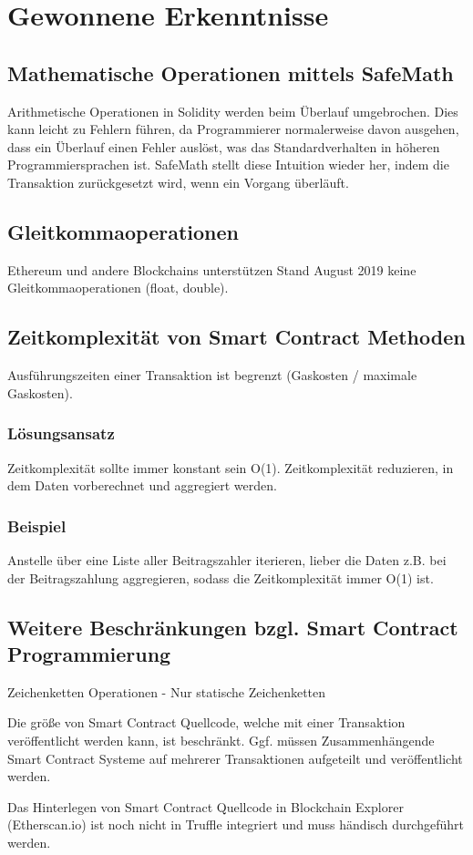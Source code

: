 \section{Gewonnene Erkenntnisse}


\subsection{Mathematische Operationen mittels SafeMath}
Arithmetische Operationen in Solidity werden beim Überlauf umgebrochen. Dies kann leicht zu Fehlern führen, da Programmierer normalerweise davon ausgehen, dass ein Überlauf einen Fehler auslöst, was das Standardverhalten in höheren Programmiersprachen ist. SafeMath stellt diese Intuition wieder her, indem die Transaktion zurückgesetzt wird, wenn ein Vorgang überläuft. %


\subsection{Gleitkommaoperationen}
Ethereum und andere Blockchains unterstützen Stand August 2019 keine Gleitkommaoperationen (float, double).


\subsection{Zeitkomplexität von Smart Contract Methoden}
Ausführungszeiten einer Transaktion ist begrenzt (Gaskosten / maximale Gaskosten).

\subsubsection*{Lösungsansatz}
Zeitkomplexität sollte immer konstant sein O(1). Zeitkomplexität reduzieren, in dem Daten vorberechnet und aggregiert werden.

\subsubsection*{Beispiel} Anstelle über eine Liste aller Beitragszahler iterieren, lieber die Daten z.B. bei der Beitragszahlung aggregieren, sodass die Zeitkomplexität immer O(1) ist.


\subsection{Weitere Beschränkungen bzgl. Smart Contract Programmierung}

\begin{compactitem}
\item Zeichenketten Operationen -  Nur statische Zeichenketten
\item Die größe von Smart Contract Quellcode, welche mit einer Transaktion veröffentlicht werden kann, ist beschränkt. Ggf. müssen Zusammenhängende Smart Contract Systeme auf mehrerer Transaktionen aufgeteilt und veröffentlicht werden.
\item Das Hinterlegen von Smart Contract Quellcode in  Blockchain Explorer (Etherscan.io) ist noch nicht in Truffle integriert und muss händisch durchgeführt werden.
\end{compactitem}



